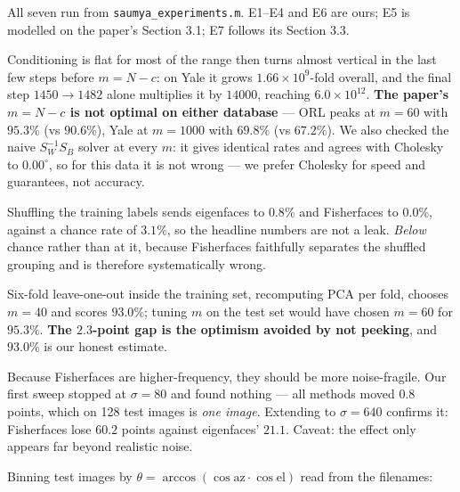 \documentclass[11pt]{article}
\newcommand{\Sw}{S_W}
\newcommand{\Sb}{S_B}
\begin{document}
All seven run from \texttt{saumya\_experiments.m}. E1--E4 and E6 are ours; E5
is modelled on the paper's Section 3.1; E7 follows its Section 3.3.

\begin{description}[leftmargin=1.1em,style=nextline,itemsep=2pt]

\item[E1 --- $\operatorname{cond}(\Sw)$ against $m$ (ORL and Yale).]
Conditioning is flat for most of the range then turns almost vertical in the
last few steps before $m=N-c$: on Yale it grows $1.66\times10^{9}$-fold overall,
and the final step $1450\to1482$ alone multiplies it by $14000$, reaching
$6.0\times10^{12}$. \textbf{The paper's $m=N-c$ is not optimal on either
database} --- ORL peaks at $m=60$ with $95.3\%$ (vs $90.6\%$), Yale at
$m=1000$ with $69.8\%$ (vs $67.2\%$). We also checked the naive
$\Sw^{-1}\Sb$ solver at every $m$: it gives identical rates and agrees with
Cholesky to $0.00^\circ$, so for this data it is not wrong --- we prefer
Cholesky for speed and guarantees, not accuracy.

\item[E2 --- Label permutation (ORL).]
Shuffling the training labels sends eigenfaces to $0.8\%$ and Fisherfaces to
$0.0\%$, against a chance rate of $3.1\%$, so the headline numbers are not a
leak. \emph{Below} chance rather than at it, because Fisherfaces faithfully
separates the shuffled grouping and is therefore systematically wrong.

\item[E3 --- Cross-validated $m$ (ORL).]
Six-fold leave-one-out inside the training set, recomputing PCA per fold,
chooses $m=40$ and scores $\mathbf{93.0\%}$; tuning $m$ on the test set would
have chosen $m=60$ for $95.3\%$. \textbf{The $2.3$-point gap is the optimism
avoided by not peeking}, and $93.0\%$ is our honest estimate.

\item[E4 --- Noise robustness (ORL), a prediction tested.]
Because Fisherfaces are higher-frequency, they should be more noise-fragile.
Our first sweep stopped at $\sigma=80$ and found nothing --- all methods moved
$0.8$ points, which on 128 test images is \emph{one image}. Extending to
$\sigma=640$ confirms it: Fisherfaces lose $60.2$ points against eigenfaces'
$21.1$. Caveat: the effect only appears far beyond realistic noise.

\item[E5 --- Error against lighting angle (Yale).]
Binning test images by $\theta=\arccos(\cos\text{az}\cdot\cos\text{el})$ read
from the filenames:


\end{description}
\end{document}
